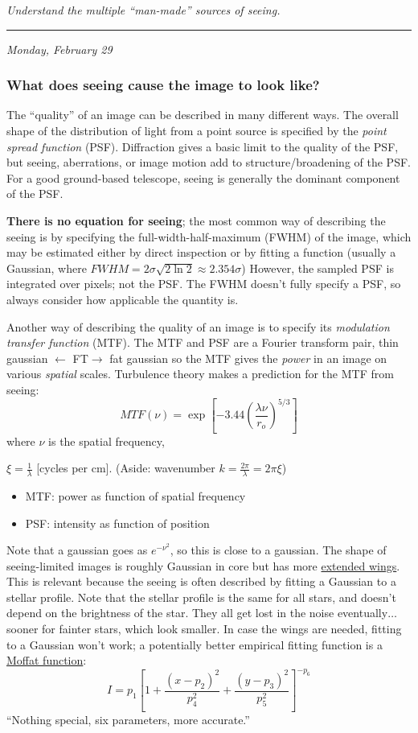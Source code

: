 \documentclass[12pt]{article}
\newcommand{\mynotes}[1]{\textcolor{myBlue}{#1}}
\newcommand{\test}[1]{%
    \begin{center}
        {\parbox{0.9\textwidth}{\textit{\small#1}}}
    \end{center}}
\newcommand{\mydate}[1]{
    \begin{flushright}
        \rule{\textwidth}{0.4pt} %
        \footnotesize\hfill\textit{#1}
    \end{flushright}}
\begin{document}
\test{Understand the multiple ``man-made'' sources of seeing.}

\mydate{Monday, February 29}
\subsubsection{What does seeing cause the image to look like?}
The ``quality'' of an image can be described in many different ways.
The overall shape of the distribution of light from a point source is
specified by the \textit{point spread function} (PSF). Diffraction gives a basic
limit to the quality of the PSF, but seeing, aberrations, or image
motion add to structure/broadening of the PSF\@. For a good ground-based
telescope, seeing is generally the dominant component of the PSF.

\textbf{There is no equation for seeing};
the most common way of describing the seeing is by specifying the
full-width-half-maximum (FWHM) of the image, which may be estimated either by
direct inspection or by fitting a function (usually a Gaussian, where $FWHM =
2\sigma\sqrt{2\ln{2}} \approx 2.354\sigma$) However, the sampled PSF is
integrated over pixels; not the PSF\@. The FWHM doesn't fully specify a PSF, so
always consider how applicable the quantity is.

Another way of describing the quality of an image is to specify its
\textit{modulation transfer function} (MTF). The MTF and PSF are a Fourier
transform pair, \mynotes{thin gaussian $\leftarrow$\small
FT\normalsize$\rightarrow$ fat gaussian} so the MTF gives the \textit{power} in
an image on various \textit{spatial} scales. Turbulence theory makes a
prediction for the MTF from
seeing:
\[
    MTF(\nu)
    = \exp \left[ -3.44 \left( \frac{\lambda\nu}{r_{o}} \right) ^{5/3} \right]
    \]
where $\nu$ is the spatial frequency,
\mynotes{$\xi = \frac{1}{\lambda}$ [cycles per cm].
(Aside: wavenumber $k = \frac{2\pi}{\lambda} = 2\pi\xi$)
\begin{itemize}
    \item MTF: power as function of spatial frequency
    \item PSF: intensity as function of position
\end{itemize}}

Note that a gaussian goes as $e^{-\nu^{2}}$, so this is close to a gaussian.
The shape of seeing-limited images is roughly Gaussian in core but has more \href{http://astronomy.nmsu.edu/holtz/a535/html/diagrams/a535/racine2.htm}
{extended wings}. This is relevant because the seeing
is often described by fitting a Gaussian to a stellar profile. \mynotes{Note
that the stellar profile is the same for all stars, and doesn't depend on the
brightness of the star. They all get lost in the noise eventually$\ldots$
sooner for fainter stars, which look smaller. In case the wings are needed,
fitting to a Gaussian won't work;} a potentially better empirical fitting
function is a \href{http://astronomy.nmsu.edu/holtz/a535/html/diagrams/a535/racine3.htm}
{Moffat function}:
\[
    I = p_{1} \left[
        1 + \frac{ \left( x-p_{2} \right) ^{2}}{p_{4}^{2}} +
        \frac{ \left( y-p_{3} \right) ^{2}}{p_{5}^{2}} \right] ^{-p_{6}}
    \]
``Nothing special, six parameters, more accurate.''
\end{document}
